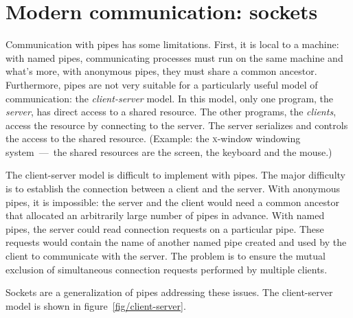 %
%

\chapter{\label{sec/sockets}Modern communication: sockets}

Communication with pipes has some limitations. First, it is local to a
machine: with named pipes, communicating processes must run on the
same machine and what's more, with anonymous pipes, they must share a
common ancestor. Furthermore, pipes are not very suitable for a
particularly useful model of communication: the \emph{client-server}
model. In this model, only one program, the \emph{server}, has direct
access to a shared resource.  The other programs, the \emph{clients},
access the resource by connecting to the server. The server serializes
and controls the access to the shared resource. (Example: the
\textsc{x}-window windowing system~---~the shared resources are
the screen, the keyboard and the mouse.)

The client-server model is difficult to implement with pipes. The
major difficulty is to establish the connection between a client and
the server. With anonymous pipes, it is impossible: the server and the
client would need a common ancestor that allocated an arbitrarily
large number of pipes in advance. With named pipes, the server could
read connection requests on a particular pipe. These requests would
contain the name of another named pipe created and used by the client
to communicate with the server. The problem is to ensure the mutual
exclusion of simultaneous connection requests performed by multiple
clients.

Sockets are a generalization of pipes addressing these issues. The
client-server model is shown in figure~\ref{fig/client-server}.

